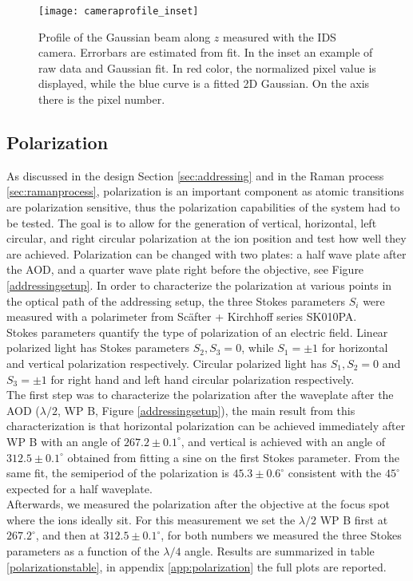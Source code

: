 \begin{figure}
\centering
\texttt{[image: cameraprofile\_inset]}
\caption{Profile of the Gaussian beam along $z$ measured with the IDS camera. Errorbars are estimated from fit. In the inset an example of raw data and Gaussian fit. In red color, the normalized pixel value is displayed, while the blue curve is a fitted 2D Gaussian. On the axis there is the pixel number.}
\label{cameraprofile}
\end{figure}

\subsection{Polarization}
\label{sec:polarization}
As discussed in the design Section \ref{sec:addressing} and in the Raman process \ref{sec:ramanprocess}, polarization is an important component as atomic transitions are polarization sensitive, thus the polarization capabilities of the system had to be tested. The goal is to allow for the generation of vertical, horizontal, left circular, and right circular polarization at the ion position and test how well they are achieved. Polarization can be changed with two plates: a half wave plate after the AOD, and a quarter wave plate right before the objective, see Figure \ref{addressingsetup}. In order to characterize the polarization at various points in the optical path of the addressing setup, the three Stokes parameters $S_i$ \cite{stokes} were measured with a polarimeter from Sc\"after + Kirchhoff series SK010PA.\\
Stokes parameters quantify the type of polarization of an electric field. Linear polarized light has Stokes parameters $S_2,S_3 = 0$, while $S_1 = \pm 1$ for horizontal and vertical polarization respectively. Circular polarized light has $S_1, S_2 = 0$ and $S_3=\pm 1$ for right hand and left hand circular polarization respectively.\\
The first step was to characterize the polarization after the waveplate after the AOD ($\lambda/2$, WP B, Figure \ref{addressingsetup}), the main result from this characterization is that horizontal polarization can be achieved immediately after WP B with an angle of $267.2\pm 0.1 ^{\circ}$, and vertical is achieved with an angle of $312.5\pm0.1^{\circ}$ obtained from fitting a sine on the first Stokes parameter. From the same fit, the semiperiod of the polarization is $45.3\pm 0.6^\circ$ consistent with the $45^\circ$ expected for a half waveplate.\\
Afterwards, we measured the polarization after the objective at the focus spot where the ions ideally sit. For this measurement we set the $\lambda/2$ WP B first at $267.2^\circ$, and then at $312.5\pm0.1^{\circ}$, for both numbers we measured the three Stokes parameters as a function of the $\lambda/4$ angle. Results are summarized in table \ref{polarizationstable}, in appendix \ref{app:polarization} the full plots are reported.
